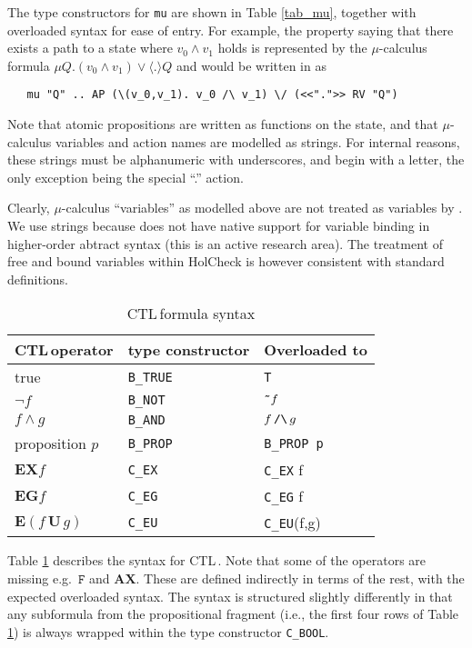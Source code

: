 \documentclass[12pt,fleqn]{article}
\newcommand{\ctl}{\textsf{CTL}\,}
\newcommand{\hc}{HolCheck}
\newcommand{\hand}{\texttt{/\char'134}}
\newcommand{\hnot}{\texttt{\~{}}}
\begin{document}
The type constructors for \texttt{mu}  are shown in Table \ref{tab_mu}, together with overloaded syntax for ease of entry. For example, the property saying that there exists a path to a state where \( v_0 \land v_1 \) holds is represented by the \(\mu\)-calculus formula \( \mu Q. (v_0 \land v_1) \lor \langle.\rangle Q \) and would be written in \HOL{} as

\begin{verbatim}
   mu "Q" .. AP (\(v_0,v_1). v_0 /\ v_1) \/ (<<".">> RV "Q")
\end{verbatim}

Note that atomic propositions are written as functions on the state, and that \(\mu\)-calculus variables and action names are modelled as \HOL{} strings. For internal reasons, these strings must be alphanumeric with underscores, and begin with a letter, the only exception being the special ``.'' action.

Clearly, \(\mu\)-calculus ``variables'' as modelled above are not treated as variables by \HOL{}. We use strings because \HOL{} does not have native support for variable binding in higher-order abtract syntax (this is an active research area). The treatment of free and bound variables within \hc{} is however consistent with standard definitions.

\begin{table}
\caption{\HOL{} \ctl formula syntax}
\label{tab_ctl}
\begin{tabular}{|l|l|l|}
\hline
\ctl operator & \HOL{} type constructor & Overloaded to \\
\hline
true & \texttt{B\_TRUE} & \texttt{T} \\
$\lnot f$ & \texttt{B\_NOT} & $\hnot f $  \\
$f \land g$ & \texttt{B\_AND} & $f\,\hand\,g$ \\
proposition $p$ & \texttt{B\_PROP} & \texttt{B\_PROP p} \\
$\mathbf{EX} f$ & \texttt{C\_EX} & \texttt{C\_EX} f \\
$\mathbf{EG} f$ & \texttt{C\_EG} & \texttt{C\_EG} f \\
$\mathbf{E}(f\,\mathbf{U}\,g)$ & \texttt{C\_EU} & \texttt{C\_EU}(f,g) \\
\hline
\end{tabular}
\end{table}

Table \ref{tab_ctl} describes the syntax for \ctl \index{holCheckLib!properties!ctl@\ctl}. Note that some of the operators are missing e.g.\ \( \mathtt{F} \) and \( \mathbf{AX} \). These are defined indirectly in terms of the rest, with the expected overloaded syntax. The syntax is structured slightly differently in that any subformula from the propositional fragment (i.e., the first four rows of Table \ref{tab_ctl}) is always wrapped within the type constructor \texttt{C\_BOOL}.
\end{document}
